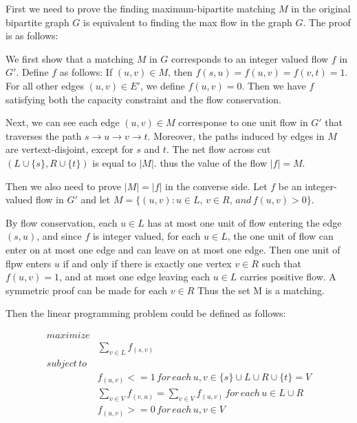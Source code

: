 \documentclass[12pt]{article}
\begin{document}
First we need to prove the finding maximum-bipartite matching $M$ in the original bipartite graph $G$ is equivalent to finding the max flow in the graph $G$. The proof is as follows:

We first show that a matching $M$ in $G$ corresponds to an integer valued flow $f$ in $G'$. Define $f$ as follows: If $(u,v) \in M$, then $f(s,u) = f(u,v) = f(v,t) = 1$. For all other edges $(u,v) \in E'$, we define $f(u,v) = 0$. Then we have $f$ satisfying both the capacity constraint and the flow conservation.

Next, we can see each edge $(u,v) \in M$ corresponse to one unit flow in $G'$ that traverses the path $s \rightarrow u \rightarrow v \rightarrow t$. Moreover, the paths induced by edges in $M$ are vertext-disjoint, except for $s$ and $t$. The net flow across cut $(L \cup \{s\}, R \cup \{t\})$ is equal to $|M|$. thus the value of the flow $|f| = M$. 

Then we also need to prove $|M| = |f|$ in the converse side. Let $f$ be an integer-valued flow in $G'$ and let $M = \{(u,v): u \in L,\, v \in R,\, and\, f(u,v) >0\}$.

By flow conservation, each $u \in L$ has at most one unit of flow entering the edge $(s,u)$, and since $f$ is integer valued, for each $u \in L$, the one unit of flow can enter on at most one edge and can leave on at most one edge. Then one unit of flpw enters $u$ if and only if there is exactly one vertex $v \in R$ such that $f(u,v) = 1$, and at most one edge leaving each $u \in L$ carries positive flow. A symmetric proof can be made for each $v \in R$ Thus the set M is a matching.

Then the linear programming problem could be defined as follows:

\begin{equation}
\begin{aligned}
maximize& \\
& \sum_{v \in L} f_{(s,v)}\\
subject \, to&  \\
& f_{(u,v)} <=1 \, for \, each \, u,v \in \{s\} \cup L \cup R \cup \{t\} = V\\ 
& \sum_{v \in V} f_{(v,u)} = \sum_{v \in V} f_{(u,v)} \, for \, each \, u \in L \cup R\\
&f_{(u,v)} >= 0 \, for \,each \, u,v \in V
\end{aligned}
\end{equation}
\end{document}
